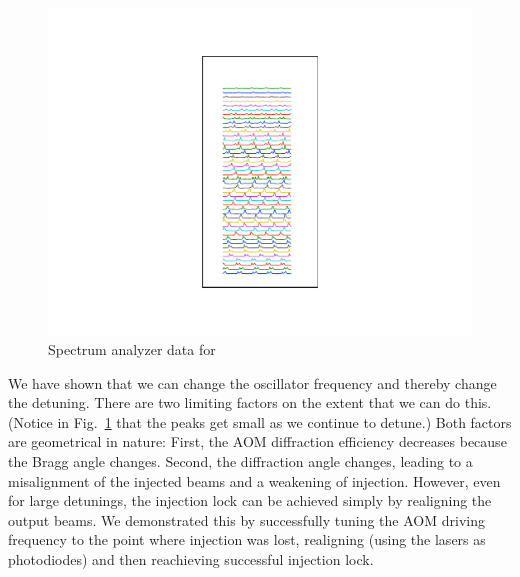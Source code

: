 \begin{figure}
\centerline{\includegraphics{all_splittingData}}
\caption[]{\label{fig:alldata} 
Spectrum analyzer data for }
\end{figure}


We have shown that we can change the oscillator frequency and thereby change the detuning. There are two limiting factors on the extent that we can do this. (Notice in Fig.\ \ref{fig:alldata} that the peaks get small as we continue to detune.) Both factors are geometrical in nature: First, the AOM diffraction efficiency decreases because the Bragg angle changes. Second, the diffraction angle changes, leading to a misalignment of the injected beams and a weakening of injection. However, even for large detunings, the injection lock can be achieved simply by realigning the output beams. We demonstrated this by successfully tuning the AOM driving frequency to the point where injection was lost, realigning (using the lasers as photodiodes) and then reachieving successful injection lock.
